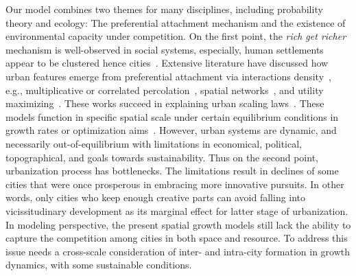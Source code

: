 \documentclass[reprint,unsortedaddress,amsmath,amssymb,aps,prl,showkeys]{revtex4-2}
\begin{document}


Our model combines two themes for many disciplines, including probability theory and ecology: The preferential attachment mechanism and the existence of environmental capacity under competition. On the first point, the \textit{rich get richer} mechanism is well-observed in social systems, especially, human settlements appear to be clustered hence cities~\cite{marsili1998interacting}. Extensive literature have discussed how urban features emerge from preferential attachment via interactions density~\cite{ccolak2016understanding,louf2014congestion,fujita1976spatial}, e.g., multiplicative or correlated percolation~\cite{makse1995modelling,PhysRevE.58.7054,rybski2013distance}, spatial networks~\cite{marsili1998interacting,court2013origins,Li2017Simple}, and utility maximizing~\cite{axtell2001emergent}. These works succeed in explaining urban scaling laws~\cite{bettencourt2007growth,court2013origins,batty2019urbanscalinglaw}. These models function in specific spatial scale under certain equilibrium conditions in growth rates or optimization aims~\cite{zipf1949human}. However, urban systems are dynamic, and necessarily out-of-equilibrium with limitations in economical, political, topographical, and goals towards sustainability. Thus on the second point, urbanization process has bottlenecks. The limitations result in declines of some cities that were once prosperous in embracing more innovative pursuits\cite{batty2017urban}. In other words, only cities who keep enough creative parts can avoid falling into vicissitudinary development as its marginal effect for latter
stage of urbanization\cite{atkinson2012urban, girardin2009quantifying,gomez2018explaining,parris2003characterizing,batty2008size}. In modeling perspective, the present spatial growth models still lack the ability to capture the competition among cities in both space and resource. To address this issue needs a cross-scale consideration of inter- and intra-city formation in growth dynamics, with some sustainable conditions.
\end{document}
